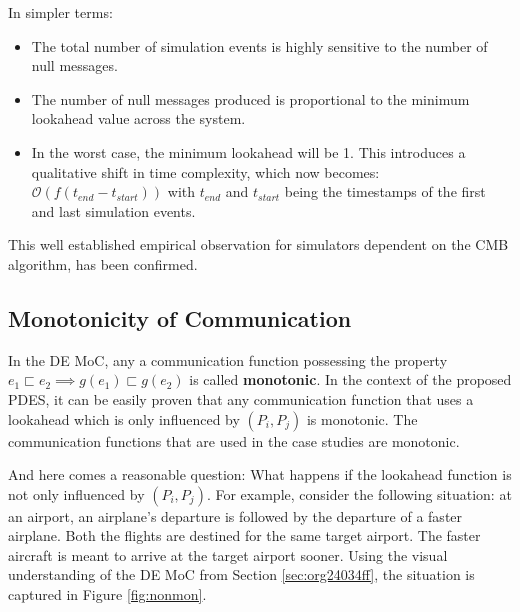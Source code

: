 \documentclass[11pt]{article}
\begin{document}
In simpler terms: 
\begin{itemize}
\item The total number of simulation events is highly sensitive to the number of null messages.
\item The number of null messages produced is proportional to the minimum lookahead value across the system.
\item In the worst case, the minimum lookahead will be 1. This introduces a qualitative shift in time complexity, which now becomes: 
\(\mathcal{O}(f(t_{end}-t_{start}))\) with \(t_{end}\) and \(t_{start}\) being the timestamps of the first and last simulation events.
\end{itemize}
This well established empirical observation \cite{Fujimoto1999} for simulators dependent on the CMB algorithm, has been confirmed.

\subsection{Monotonicity of Communication}
\label{sec:org2a139d7}
In the DE MoC, any a communication function possessing the property \(e_1 \sqsubset e_2 \implies g(e_1) \sqsubset g(e_2)\) is called \textbf{monotonic}.
In the context of the proposed PDES, it can be easily proven that any communication function that uses a lookahead which is only influenced by \((P_i, P_j)\) is monotonic.
The communication functions that are used in the case studies are monotonic.

And here comes a reasonable question: What happens if the lookahead function is not only influenced by \((P_i, P_j)\).
For example, consider the following situation: 
at an airport, an airplane's departure is followed by the departure of a faster airplane.
Both the flights are destined for the same target airport.
The faster aircraft is meant to arrive at the target airport sooner.
Using the visual understanding of the DE MoC from Section \ref{sec:org24034ff}, the situation is captured in Figure \ref{fig:nonmon}.
\end{document}
